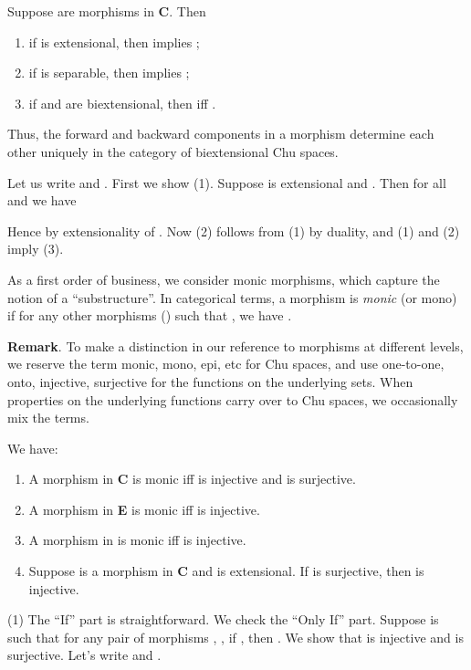 \documentclass{LMCS}
\let\pf\proof
\let\epf\endproof
\begin{document}
\begin{prop}\label{lamarche}
Suppose  are morphisms in {\bf C}.
Then
\begin{enumerate}[\em(1)]
\item if    is extensional, then  implies ;
\item if     is separable, then  implies ;
\item if    and  are biextensional, then  iff .
\end{enumerate}
\end{prop}

Thus,  the forward and backward components in a morphism determine each other
uniquely in the category of biextensional Chu spaces.

\pf
Let us write  and .  First
we show (1). Suppose  is extensional and . Then for all  and  we have

Hence  by extensionality of
. Now (2) follows from (1) by duality, and (1) and (2) imply
(3).  \epf

As a first order of business, we consider monic morphisms,
which capture the notion of a ``substructure''.
In categorical terms, a morphism  is {\em monic} (or mono)
if for any other morphisms  () such that
, we have
.

{\bf Remark}. To make a distinction in our reference to
morphisms at different levels, we reserve the term monic, mono, epi, etc for
Chu spaces, and use one-to-one, onto, injective, surjective for the functions
on the underlying sets. When properties on the underlying functions carry over to
Chu spaces, we occasionally mix the terms.

\begin{prop}\label{CB} We have:
\begin{enumerate}[\em(1)]
\item A morphism  in {\bf C} is monic  iff
 is injective and  is surjective.
\item A morphism  in {\bf E} is monic  iff
 is injective.
\item A morphism   in  is monic  iff
 is injective.
\item Suppose  is a
morphism in  {\bf C} and  is extensional.
If  is surjective, then  is injective.
\end{enumerate}
\end{prop}

\pf
(1) The ``If'' part is straightforward. We check the ``Only If'' part. 
Suppose  is such that for any pair of
morphisms , , if , then .  We show that  is injective and  is
surjective.  Let's write  and . 
\end{document}

